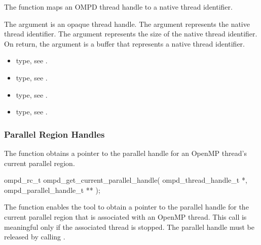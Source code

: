 \descr
The  function maps an OMPD thread handle to a 
native thread identifier.

\argdesc
The  argument is an opaque thread handle. The  
argument represents the native thread identifier. The 
argument represents the size of the native thread identifier. On return, the 
 argument is a buffer that represents a native thread identifier.

\crossreferences
\begin{itemize}
\item {} type, see .

\item {} type, see .

\item {} type, 
see .

\item {} type, see .
\end{itemize}



\subsubsection{Parallel Region Handles}

\label{subsubsubsec:ompd_get_current_parallel_handle}
\summary
The   function obtains a pointer 
to the parallel handle for an OpenMP thread's current parallel region.

\format
\begin{cspecific}
\begin{ompSyntax}
ompd_rc_t ompd_get_current_parallel_handle(
  ompd_thread_handle_t *,
  ompd_parallel_handle_t **
);
\end{ompSyntax}
\end{cspecific}

\descr
The   function enables the tool 
to obtain a pointer to the parallel handle for the current parallel region 
that is associated with an OpenMP thread. This call is meaningful only if 
the associated thread is stopped. The parallel handle must be released by 
calling .

